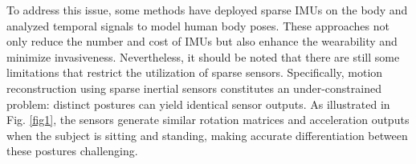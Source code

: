 \documentclass[letterpaper]{article} %
\begin{document}


To address this issue, some methods \cite{huang2018deep,yi2021transpose,jiang2022transformer,von2017sparse,yi2022physical} have deployed sparse IMUs on the body and analyzed temporal signals to model human body poses.
These approaches not only reduce the number and cost of IMUs but also enhance the wearability and minimize invasiveness.
Nevertheless, it should be noted that there are still some limitations that restrict the utilization of sparse sensors.
%
Specifically, motion reconstruction using sparse inertial sensors constitutes an under-constrained problem: distinct postures can yield identical sensor outputs. As illustrated in Fig. \ref{fig1}, the sensors generate similar rotation matrices and acceleration outputs when the subject is sitting and standing, making accurate differentiation between these postures challenging.
\end{document}
